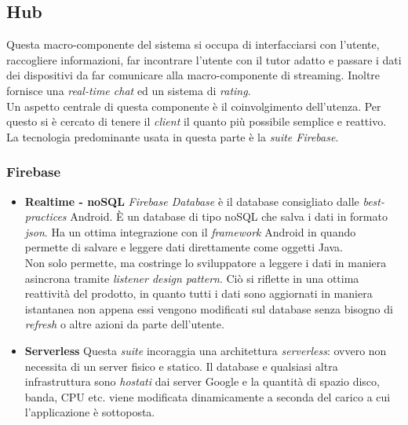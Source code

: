 \documentclass[conference]{IEEEtran}
\begin{document}
	\subsection{Hub}
		Questa macro-componente del sistema si occupa di interfacciarsi con l'utente, raccogliere informazioni, far incontrare l'utente con
		il tutor adatto e passare i dati dei dispositivi da far comunicare alla macro-componente di streaming.
		Inoltre fornisce una \textit{real-time chat} ed un sistema di \textit{rating}.\\
		Un aspetto centrale di questa componente è il coinvolgimento dell'utenza. Per questo si è cercato di tenere il \textit{client} il quanto
		più possibile semplice e reattivo.\\
		La tecnologia predominante usata in questa parte è la \textit{suite Firebase}.
		
		\subsubsection{Firebase}
		\begin{itemize}
			\item \textbf{Realtime - noSQL}
				\textit{Firebase Database} è il database consigliato dalle \textit{best-practices} Android. È un database di tipo noSQL
				che salva i dati in formato \textit{json}. Ha un ottima integrazione con il \textit{framework} Android in quando permette
				di salvare e leggere dati direttamente come oggetti Java.\\
				Non solo permette, ma costringe	lo sviluppatore a leggere i dati in maniera asincrona tramite \textit{listener design pattern}. Ciò si riflette
				in una ottima reattività del prodotto, in quanto tutti i dati sono aggiornati in maniera istantanea non appena essi
				vengono modificati sul database senza bisogno di \textit{refresh} o altre azioni da parte dell'utente.\\
			
			\item \textbf{Serverless}
				Questa \textit{suite} incoraggia una architettura \textit{serverless}: ovvero non necessita di un server fisico e statico.
				Il database e qualsiasi altra infrastruttura sono \textit{hostati} dai server Google e la quantità di spazio disco, 
				banda, CPU etc. viene modificata dinamicamente a seconda del carico a cui l'applicazione è sottoposta.
		\end{itemize}
\end{document}
